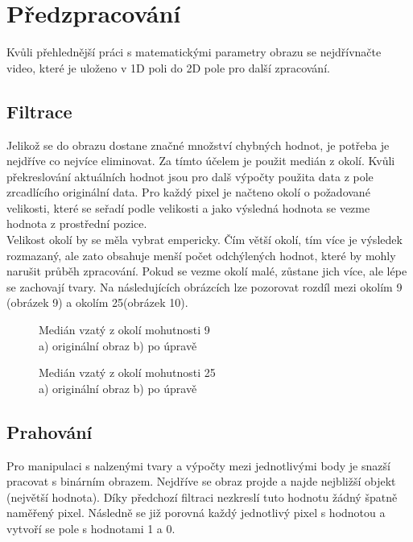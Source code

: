\section{Předzpracování}

Kvůli přehlednější práci s matematickými parametry obrazu se nejdřívnačte video, které je uloženo v 1D poli do 2D pole pro další zpracování.\\

\subsection{Filtrace}
Jelikož se do obrazu dostane značné množství chybných hodnot, je potřeba je nejdříve co nejvíce eliminovat. Za tímto účelem je použit medián z okolí. Kvůli překreslování aktuálních hodnot jsou pro dalš výpočty použita data z pole zrcadlícího originální data. Pro každý pixel je načteno okolí o požadované velikosti, které se seřadí podle velikosti a jako výsledná hodnota se vezme hodnota z prostřední pozice.\\

Velikost okolí by se měla vybrat empericky. Čím větší okolí, tím více je výsledek rozmazaný, ale zato obsahuje menší počet odchýlených hodnot, které by mohly narušit průběh zpracování. Pokud se vezme okolí malé, zůstane jich více, ale lépe se zachovají tvary. Na následujících obrázcích lze pozorovat rozdíl mezi okolím 9 (obrázek 9) a okolím 25(obrázek 10).\\

\begin{figure}[htp]
\centering
{} \hfil
{}
\caption{Medián vzatý z okolí mohutnosti 9 \\ a) originální obraz b) po úpravě}
\label{fig:neigh9}
\end{figure}
\begin{figure}[htp]
\centering
{} \hfil
{}
\caption{Medián vzatý z okolí mohutnosti 25 \\ a) originální obraz b) po úpravě}
\label{fig:neigh25}
\end{figure}

\subsection{Prahování}
Pro manipulaci s nalzenými tvary a výpočty mezi jednotlivými body je snazší pracovat s binárním obrazem. Nejdříve se obraz projde a najde nejbližší objekt (největší hodnota). Díky předchozí filtraci nezkreslí tuto hodnotu žádný špatně naměřený pixel. Následně se již porovná každý jednotlivý pixel s hodnotou a vytvoří se pole s hodnotami 1 a 0.

